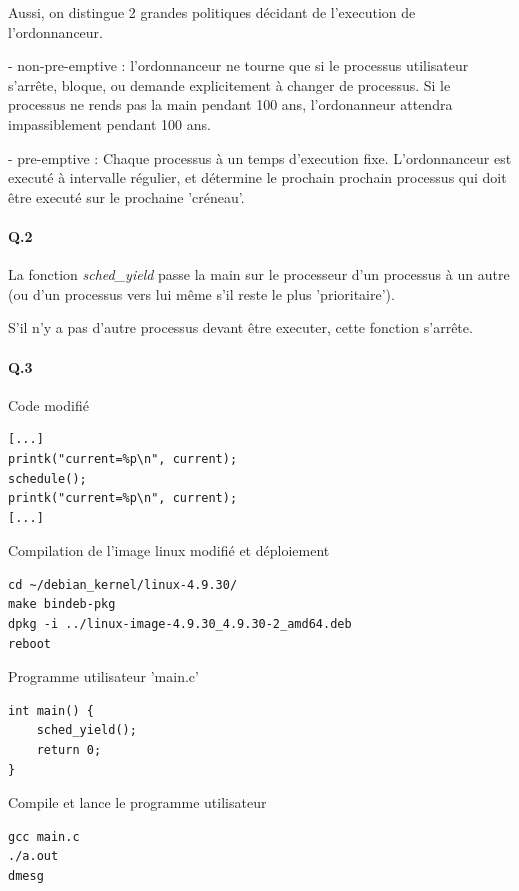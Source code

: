 \documentclass[10pt]{article}
\begin{document}
        
        Aussi, on distingue 2 grandes politiques décidant de l'execution de l'ordonnanceur.

        - non-pre-emptive : l'ordonnanceur ne tourne que si le processus utilisateur s'arrête, bloque, ou demande explicitement à changer de processus.
        Si le processus ne rends pas la main pendant 100 ans, l'ordonanneur attendra impassiblement pendant 100 ans.

        \label{preempt}
        - pre-emptive : Chaque processus à un temps d'execution fixe.
        L'ordonnanceur est executé à intervalle régulier, et détermine le prochain prochain processus qui doit être executé sur le prochaine 'créneau'.


        \paragraph{Q.2}
        La fonction \textit{sched\_yield} passe la main sur le processeur d'un processus à un autre
        (ou d'un processus vers lui même s'il reste le plus 'prioritaire').
        
        S'il n'y a pas d'autre processus devant être executer, cette fonction s'arrête.
        
        \paragraph{Q.3}
        Code modifié
        \lstset{language=C}
\begin{lstlisting}[frame=single]
[...]
printk("current=%p\n", current);
schedule();
printk("current=%p\n", current);
[...]
\end{lstlisting}

        Compilation de l'image linux modifié et déploiement
\lstset{language=bash}
\begin{lstlisting}[frame=single]
cd ~/debian_kernel/linux-4.9.30/
make bindeb-pkg
dpkg -i ../linux-image-4.9.30_4.9.30-2_amd64.deb
reboot
\end{lstlisting}

Programme utilisateur 'main.c'
\lstset{language=C}
\begin{lstlisting}[frame=single]
int main() {
    sched_yield();
    return 0;
}
\end{lstlisting}

Compile et lance le programme utilisateur
\begin{lstlisting}[frame=single]
gcc main.c
./a.out
dmesg
\end{lstlisting}
\end{document}
